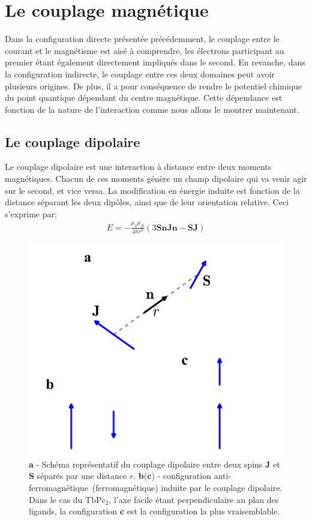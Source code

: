 \section{Le couplage magnétique}
Dans la configuration directe présentée précédemment, le couplage entre le courant et le magnétisme est aisé à comprendre, les électrons participant au premier étant également directement impliqués dans le second. En revanche, dans la configuration indirecte, le couplage entre ces deux domaines peut avoir plusieurs origines. De plus, il a pour conséquence de rendre le potentiel chimique du point quantique dépendant du centre magnétique. Cette dépendance est fonction de la nature de l'interaction comme nous allons le montrer maintenant.

\subsection{Le couplage dipolaire}
Le couplage dipolaire est une interaction à distance entre deux moments magnétiques. Chacun de ces moments génère un champ dipolaire qui va venir agir sur le second, et vice versa. La modification en énergie induite est fonction de la distance séparant les deux dipôles, ainsi que de leur orientation relative. Ceci s'exprime par:
\begin{eqnarray}
E = -\frac{\mu_0 \mu_B}{4\pi r^3}(3\mathbf{SnJn} - \mathbf{SJ}) \nonumber
\end{eqnarray}

\begin{figure}
\parbox{7cm}{
\includegraphics[scale=0.45]{Resultats/Chap1/Figure1/figure1.pdf} 
}
\parbox{8cm}{\caption{\textbf{a} - Schéma représentatif du couplage dipolaire entre deux spins \textbf{J} et \textbf{S} séparés par une distance $r$. \textbf{b}(\textbf{c}) - configuration anti-ferromagnétique~(ferromagnétique) induite par le couplage dipolaire. Dans le cas du TbPc$_2$, l'axe facile étant perpendiculaire au plan des ligands, la configuration \textbf{c} est la configuration la plus vraisemblable.}
\label{dipolaire}
}

\end{figure}


